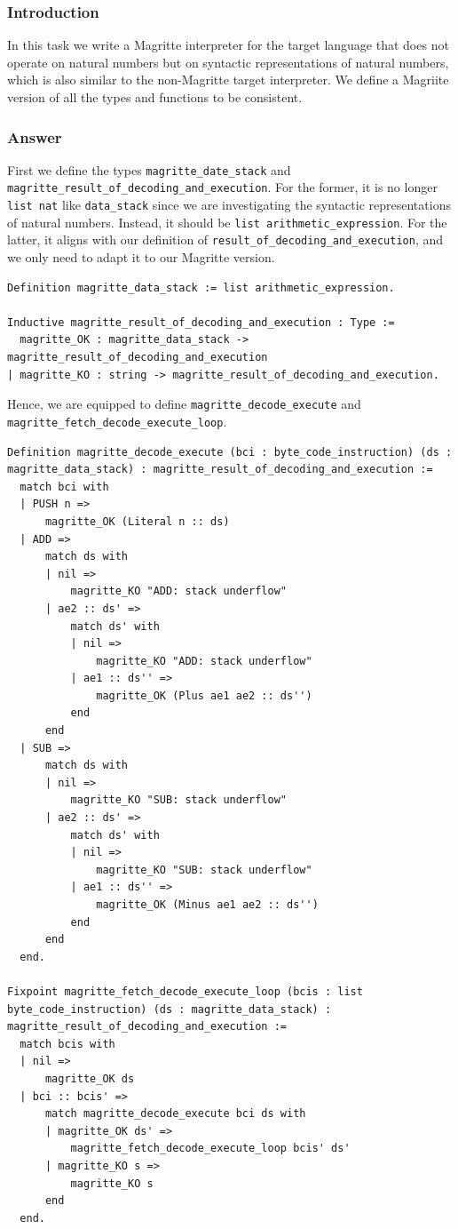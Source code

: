 \documentclass{article}
\begin{document}
\subsubsection{Introduction}
In this task we write a Magritte interpreter for the target language that does not operate on natural numbers but on syntactic representations of natural numbers, which is also similar to the non-Magritte target interpreter. We define a Magriite version of all the types and functions to be consistent.

\subsubsection{Answer}
First we define the types \texttt{magritte\_date\_stack} and \texttt{magritte\_result\_of\_decoding\_and\_execution}. For the former, it is no longer \texttt{list nat} like \texttt{data\_stack} since we are investigating the syntactic representations of natural numbers. Instead, it should be \texttt{list arithmetic\_expression}. For the latter, it aligns with our definition of \texttt{result\_of\_decoding\_and\_execution}, and we only need to adapt it to our Magritte version. 
\begin{lstlisting}
Definition magritte_data_stack := list arithmetic_expression.

Inductive magritte_result_of_decoding_and_execution : Type :=
  magritte_OK : magritte_data_stack -> magritte_result_of_decoding_and_execution
| magritte_KO : string -> magritte_result_of_decoding_and_execution.
\end{lstlisting}

Hence, we are equipped to define \texttt{magritte\_decode\_execute} and \texttt{magritte\_fetch\_decode\_execute\_loop}.
\begin{lstlisting}
Definition magritte_decode_execute (bci : byte_code_instruction) (ds : magritte_data_stack) : magritte_result_of_decoding_and_execution :=
  match bci with
  | PUSH n =>
      magritte_OK (Literal n :: ds)
  | ADD =>
      match ds with
      | nil =>
          magritte_KO "ADD: stack underflow"
      | ae2 :: ds' =>
          match ds' with
          | nil =>
              magritte_KO "ADD: stack underflow"
          | ae1 :: ds'' =>
              magritte_OK (Plus ae1 ae2 :: ds'')
          end
      end
  | SUB =>
      match ds with
      | nil =>
          magritte_KO "SUB: stack underflow"
      | ae2 :: ds' =>
          match ds' with
          | nil =>
              magritte_KO "SUB: stack underflow"
          | ae1 :: ds'' =>
              magritte_OK (Minus ae1 ae2 :: ds'')
          end
      end
  end.

Fixpoint magritte_fetch_decode_execute_loop (bcis : list byte_code_instruction) (ds : magritte_data_stack) : magritte_result_of_decoding_and_execution :=
  match bcis with
  | nil =>
      magritte_OK ds
  | bci :: bcis' =>
      match magritte_decode_execute bci ds with
      | magritte_OK ds' =>
          magritte_fetch_decode_execute_loop bcis' ds'
      | magritte_KO s =>
          magritte_KO s
      end
  end.
\end{lstlisting}
\end{document}
